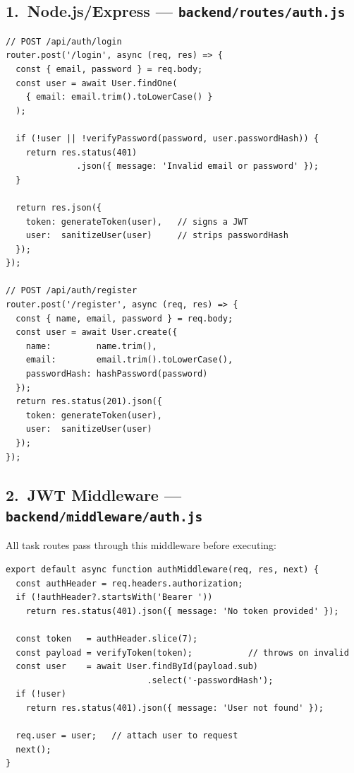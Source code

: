 \documentclass[11pt,a4paper]{article}
\begin{document}
\subsection*{1.\ Node.js/Express — \texttt{backend/routes/auth.js}}

\begin{lstlisting}[style=ts, language={[Sharp]C}]
// POST /api/auth/login
router.post('/login', async (req, res) => {
  const { email, password } = req.body;
  const user = await User.findOne(
    { email: email.trim().toLowerCase() }
  );

  if (!user || !verifyPassword(password, user.passwordHash)) {
    return res.status(401)
              .json({ message: 'Invalid email or password' });
  }

  return res.json({
    token: generateToken(user),   // signs a JWT
    user:  sanitizeUser(user)     // strips passwordHash
  });
});

// POST /api/auth/register
router.post('/register', async (req, res) => {
  const { name, email, password } = req.body;
  const user = await User.create({
    name:         name.trim(),
    email:        email.trim().toLowerCase(),
    passwordHash: hashPassword(password)
  });
  return res.status(201).json({
    token: generateToken(user),
    user:  sanitizeUser(user)
  });
});
\end{lstlisting}

\subsection*{2.\ JWT Middleware — \texttt{backend/middleware/auth.js}}

All task routes pass through this middleware before executing:

\begin{lstlisting}[style=ts, language={[Sharp]C}]
export default async function authMiddleware(req, res, next) {
  const authHeader = req.headers.authorization;
  if (!authHeader?.startsWith('Bearer '))
    return res.status(401).json({ message: 'No token provided' });

  const token   = authHeader.slice(7);
  const payload = verifyToken(token);           // throws on invalid
  const user    = await User.findById(payload.sub)
                            .select('-passwordHash');
  if (!user)
    return res.status(401).json({ message: 'User not found' });

  req.user = user;   // attach user to request
  next();
}
\end{lstlisting}
\end{document}
